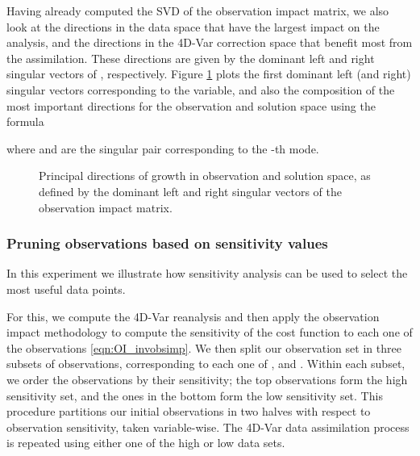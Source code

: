 \documentclass[final,sort&compress]{elsarticle}
\begin{document}
Having already computed the SVD of the observation impact matrix, we also look
at the directions in the data space  that have the largest impact on the analysis, and the directions in the 4D-Var correction space 
that benefit most from the assimilation. These directions are
given by the dominant left and right singular vectors of , respectively.
Figure \ref{fig:OI_principaldir} plots the first dominant left (and right) singular vectors
corresponding to the  variable, and also the composition of the most important  
directions for the observation and solution space using the formula


\noindent where  and  are the singular pair corresponding to the -th mode.
\begin{figure}
 \setcounter{subfigure}{0}
  \centering
  \caption{Principal directions of growth in observation and solution space, as defined by the 
  dominant left and right singular vectors of the observation impact matrix.}
  \label{fig:OI_principaldir}
 \end{figure}


\subsubsection{Pruning observations based on sensitivity values}

In this experiment we illustrate how sensitivity analysis can be used to select the most useful data points.

For this, we compute the 4D-Var reanalysis and then apply the observation impact methodology to compute 
the sensitivity of the cost function  to each one of the  observations \eqref{eqn:OI_invobsimp}.
We then split our observation set in three subsets of  observations, corresponding to each one of ,  and . 
Within each subset, we order the observations by their sensitivity; the top  observations 
form the {\sc high} sensitivity set, and the ones in the bottom  form the {\sc low} sensitivity set.
This procedure partitions our initial  observations in two halves with respect to observation sensitivity, taken variable-wise.
The 4D-Var data assimilation process is repeated using either one of the {\sc high} or {\sc low} data sets.
\end{document}
